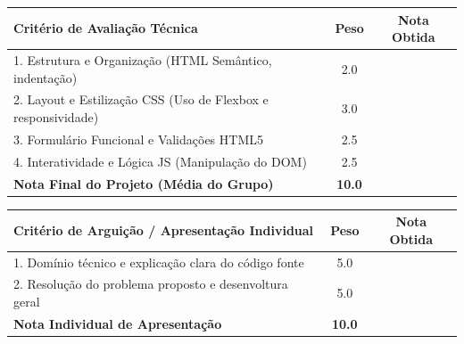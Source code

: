 \documentclass[12pt,a4paper]{article}
\begin{document}
\vspace{0.4cm}
\begin{center}
\renewcommand{\arraystretch}{1.5}
\begin{tabular}{|p{8.5cm}|c|c|}
\hline
\rowcolor{azulTitulo} 
\color{white}\textbf{Critério de Avaliação Técnica} & \color{white}\textbf{Peso} & \color{white}\textbf{Nota Obtida} \\ \hline
1. Estrutura e Organização (HTML Semântico, indentação) & 2.0 & \\ \hline
2. Layout e Estilização CSS (Uso de Flexbox e responsividade) & 3.0 & \\ \hline
3. Formulário Funcional e Validações HTML5 & 2.5 & \\ \hline
4. Interatividade e Lógica JS (Manipulação do DOM) & 2.5 & \\ \hline
\hline
\rowcolor{azulTitulo!10}
\textbf{Nota Final do Projeto (Média do Grupo)} & \textbf{10.0} & \\ \hline
\end{tabular}
\end{center}

\vspace{0.4cm}
\begin{center}
\renewcommand{\arraystretch}{1.5}
\begin{tabular}{|p{8.5cm}|c|c|}
\hline
\rowcolor{azulTitulo} 
\color{white}\textbf{Critério de Arguição / Apresentação Individual} & \color{white}\textbf{Peso} & \color{white}\textbf{Nota Obtida} \\ \hline
1. Domínio técnico e explicação clara do código fonte & 5.0 & \\ \hline
2. Resolução do problema proposto e desenvoltura geral & 5.0 & \\ \hline
\hline
\rowcolor{azulTitulo!10}
\textbf{Nota Individual de Apresentação} & \textbf{10.0} & \\ \hline
\end{tabular}
\end{center}
\end{document}
